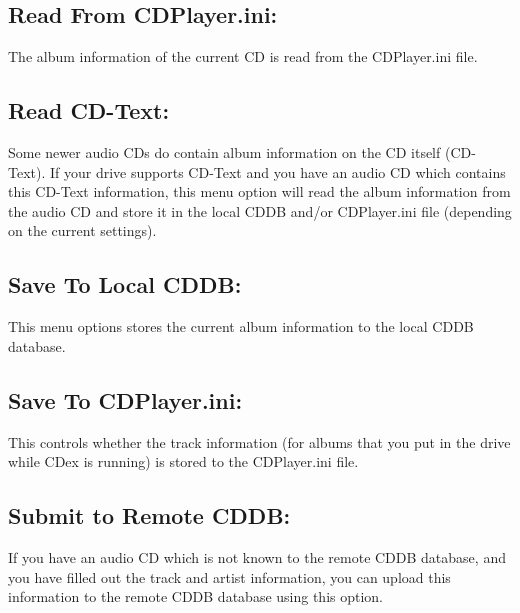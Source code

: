 \subsection{Read From CDPlayer.ini:}

The album information of the current CD is read from the CDPlayer.ini file.

\subsection{Read CD-Text:}

Some newer audio CDs do contain album information on the CD itself (CD-Text).
If your drive supports CD-Text and you have an audio CD which contains this 
CD-Text information, this menu option will read the album information from 
the audio CD and store it in the local CDDB and/or CDPlayer.ini file 
(depending on the current settings).


\subsection{Save To Local CDDB:}

This menu options stores the current album information to the local CDDB database.


\subsection{Save To CDPlayer.ini:}

This controls whether the track information (for albums that you put in the drive
while CDex is running) is stored to the CDPlayer.ini file.


\subsection{Submit to Remote CDDB:}

If you have an audio CD which is not known to the remote CDDB database, and
you have filled out the track and artist information, you can upload this
information to the remote CDDB database using this option.


